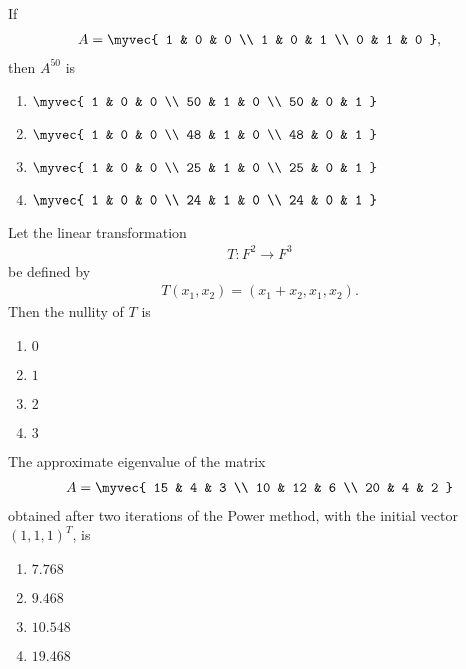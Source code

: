 \begin{multicols}{2}
\item
If 
\begin{align}
A = \myvec{
1 & 0 & 0 \\
1 & 0 & 1 \\
0 & 1 & 0
},
\end{align}
then $A^{50}$ is
\hfill{}
\begin{multicols}{2}
\begin{enumerate}
  \item $\myvec{
1 & 0 & 0 \\
50 & 1 & 0 \\
50 & 0 & 1
}$
  \item $\myvec{
1 & 0 & 0 \\
48 & 1 & 0 \\
48 & 0 & 1
}$
  \item $\myvec{
1 & 0 & 0 \\
25 & 1 & 0 \\
25 & 0 & 1
}$
  \item $\myvec{
1 & 0 & 0 \\
24 & 1 & 0 \\
24 & 0 & 1
}$
\end{enumerate}
\end{multicols}


\item
Let the linear transformation 
\begin{align}
T : F^2 \to F^3
\end{align}
be defined by
\begin{align}
T(x_1, x_2) = (x_1 + x_2, x_1, x_2).
\end{align}
Then the nullity of $T$ is
\hfill{}
\begin{multicols}{4}
\begin{enumerate}
  \item $0$
  \item $1$
  \item $2$
  \item $3$
\end{enumerate}
\end{multicols}

\item
The approximate eigenvalue of the matrix
\begin{align}
A = \myvec{
15 & 4 & 3 \\
10 & 12 & 6 \\
20 & 4 & 2
}
\end{align}
obtained after two iterations of the Power method, with the initial vector $(1,1,1)^T$, is
\hfill{}
\begin{multicols}{4}
\begin{enumerate}
  \item $7.768$
  \item $9.468$
  \item $10.548$
  \item $19.468$
\end{enumerate}
\end{multicols}



\end{multicols}
